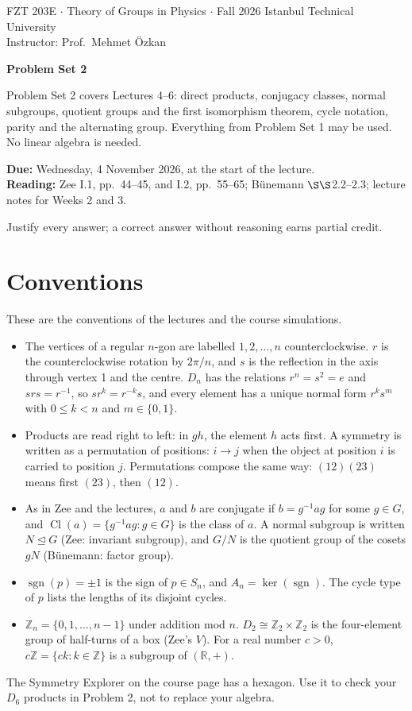 \documentclass[11pt,a4paper]{article}
\newcommand{\Z}{\mathbb{Z}}
\newcommand{\R}{\mathbb{R}}
\DeclareMathOperator{\sgn}{sgn}
\DeclareMathOperator{\Cl}{Cl}
\newcommand{\nsub}{\trianglelefteq}
\begin{document}
{\small FZT 203E $\cdot$ Theory of Groups in Physics $\cdot$ Fall 2026 \hfill Istanbul Technical University\\
Instructor: Prof.\ Mehmet Özkan}

\vspace{0.9em}
{\LARGE\bfseries Problem Set 2}

\vspace{0.5em}
Problem Set 2 covers Lectures 4--6: direct products, conjugacy classes, normal subgroups, quotient groups and the first isomorphism theorem, cycle notation, parity and the alternating group. Everything from Problem Set 1 may be used. No linear algebra is needed.

\textbf{Due:} Wednesday, 4 November 2026, at the start of the lecture.\\
\textbf{Reading:} Zee I.1, pp.~44--45, and I.2, pp.~55--65; Bünemann $\S\S$2.2--2.3; lecture notes for Weeks 2 and 3.

Justify every answer; a correct answer without reasoning earns partial credit.

\section*{\large Conventions}
These are the conventions of the lectures and the course simulations.
\begin{itemize}
  \item The vertices of a regular $n$-gon are labelled $1, 2, \dots, n$ counterclockwise. $r$ is the counterclockwise rotation by $2\pi/n$, and $s$ is the reflection in the axis through vertex 1 and the centre. $D_n$ has the relations $r^n = s^2 = e$ and $srs = r^{-1}$, so $s r^k = r^{-k} s$, and every element has a unique normal form $r^k s^m$ with $0 \le k < n$ and $m \in \{0, 1\}$.
  \item Products are read right to left: in $gh$, the element $h$ acts first. A symmetry is written as a permutation of positions: $i \to j$ when the object at position $i$ is carried to position $j$. Permutations compose the same way: $(12)(23)$ means first $(23)$, then $(12)$.
  \item As in Zee and the lectures, $a$ and $b$ are conjugate if $b = g^{-1} a g$ for some $g \in G$, and $\Cl(a) = \{g^{-1} a g : g \in G\}$ is the class of $a$. A normal subgroup is written $N \nsub G$ (Zee: invariant subgroup), and $G/N$ is the quotient group of the cosets $gN$ (Bünemann: factor group).
  \item $\sgn(p) = \pm 1$ is the sign of $p \in S_n$, and $A_n = \ker(\sgn)$. The cycle type of $p$ lists the lengths of its disjoint cycles.
  \item $\Z_n = \{0, 1, \dots, n-1\}$ under addition mod $n$. $D_2 \cong \Z_2 \times \Z_2$ is the four-element group of half-turns of a box (Zee's $V$). For a real number $c > 0$, $c\Z = \{ck : k \in \Z\}$ is a subgroup of $(\R, +)$.
\end{itemize}
The Symmetry Explorer on the course page has a hexagon. Use it to check your $D_6$ products in Problem 2, not to replace your algebra.
\end{document}
